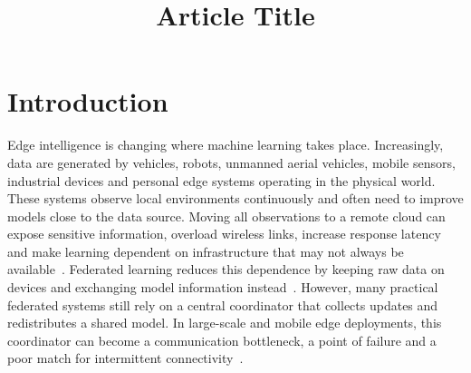 \documentclass[pdflatex,sn-mathphys-num]{sn-jnl}
\begin{document}
\title[Article Title]{Article Title}

\author[1,2]{ }

\author[2,3]{ }

\author*[1,2]{ }













\maketitle


\section{Introduction}
\label{sec:introduction}

Edge intelligence is changing where machine learning takes place. Increasingly, data are generated by vehicles, robots, unmanned aerial vehicles, mobile sensors, industrial devices and personal edge systems operating in the physical world. These systems observe local environments continuously and often need to improve models close to the data source. Moving all observations to a remote cloud can expose sensitive information, overload wireless links, increase response latency and make learning dependent on infrastructure that may not always be available~\cite{voigt2017eu,lim2020federated}. Federated learning reduces this dependence by keeping raw data on devices and exchanging model information instead~\cite{mcmahan2017communication,yang2019federated}. However, many practical federated systems still rely on a central coordinator that collects updates and redistributes a shared model. In large-scale and mobile edge deployments, this coordinator can become a communication bottleneck, a point of failure and a poor match for intermittent connectivity~\cite{bonawitz2019towards,lian2017can}.
\end{document}
